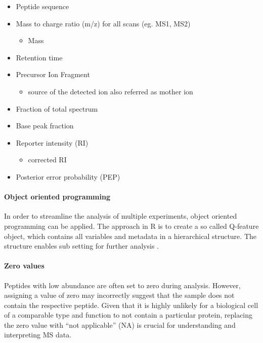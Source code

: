 \documentclass[
]{article}
\providecommand{\tightlist}{%
  \setlength{\itemsep}{0pt}\setlength{\parskip}{0pt}}
\begin{document}
\begin{itemize}
\tightlist
\item
  Peptide sequence
\item
  Mass to charge ratio (m/z) for all scans (eg. MS1, MS2)

  \begin{itemize}
  \tightlist
  \item
    Mass
  \end{itemize}
\item
  Retention time
\item
  Precursor Ion Fragment

  \begin{itemize}
  \tightlist
  \item
    source of the detected ion also referred as mother ion
  \end{itemize}
\item
  Fraction of total spectrum
\item
  Base peak fraction
\item
  Reporter intensity (RI)

  \begin{itemize}
  \tightlist
  \item
    corrected RI
  \end{itemize}
\item
  Posterior error probability (PEP)
\end{itemize}

\hypertarget{object-oriented-programming}{%
\paragraph{Object oriented
programming}\label{object-oriented-programming}}

In order to streamline the analysis of multiple experiments, object
oriented programming can be applied. The approach in R is to create a so
called Q-feature object, which contains all variables and metadata in a
hierarchical structure. The structure enables sub setting for further
analysis \citep{Vanderaa2021}.

\hypertarget{zero-values}{%
\paragraph{Zero values}\label{zero-values}}

Peptides with low abundance are often set to zero during analysis.
However, assigning a value of zero may incorrectly suggest that the
sample does not contain the respective peptide. Given that it is highly
unlikely for a biological cell of a comparable type and function to not
contain a particular protein, replacing the zero value with ``not
applicable'' (NA) is crucial for understanding and interpreting MS data.
\end{document}
